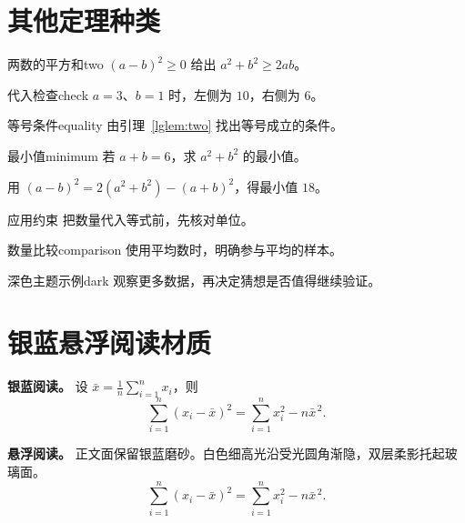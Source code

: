 \documentclass[UTF8,fontset=none,12pt,oneside]{ctexbook}
\begin{document}
\section*{其他定理种类}
\begin{lglemma}{两数的平方和}{two}
$(a-b)^2\ge0$ 给出 $a^2+b^2\ge 2ab$。
\end{lglemma}
\begin{lgexample}{代入检查}{check}
$a=3$、$b=1$ 时，左侧为 $10$，右侧为 $6$。
\end{lgexample}
\begin{lgexercise}{等号条件}{equality}
由引理~\ref{lglem:two} 找出等号成立的条件。
\end{lgexercise}
\begin{lgproblem}{最小值}{minimum}
若 $a+b=6$，求 $a^2+b^2$ 的最小值。
\end{lgproblem}
\begin{lgsolution}
用 $(a-b)^2=2(a^2+b^2)-(a+b)^2$，得最小值 $18$。
\end{lgsolution}
\begin{lgremark*}{应用约束}
把数量代入等式前，先核对单位。
\end{lgremark*}
\begin{lgapplication}{数量比较}{comparison}
使用平均数时，明确参与平均的样本。
\end{lgapplication}
\begin{lgconjecture}[lg theme=dark]{深色主题示例}{dark}
观察更多数据，再决定猜想是否值得继续验证。
\end{lgconjecture}
\clearpage
\section*{银蓝悬浮阅读材质}
\begin{glassbox}[lg material=reading,lg image=@silver,lg radius=4mm]
  \textbf{银蓝阅读。} 设 $\bar{x}=\frac{1}{n}\sum_{i=1}^n x_i$，则
  \[\sum_{i=1}^n(x_i-\bar{x})^2=\sum_{i=1}^n x_i^2-n\bar{x}^{\,2}.\]
\end{glassbox}
\begin{glassbox}[lg material=reading-lens,lg image=@silver,lg radius=4mm]
  \textbf{悬浮阅读。} 正文面保留银蓝磨砂。白色细高光沿受光圆角渐隐，双层柔影托起玻璃面。
  \[\sum_{i=1}^n(x_i-\bar{x})^2=\sum_{i=1}^n x_i^2-n\bar{x}^{\,2}.\]
\end{glassbox}
\end{document}
